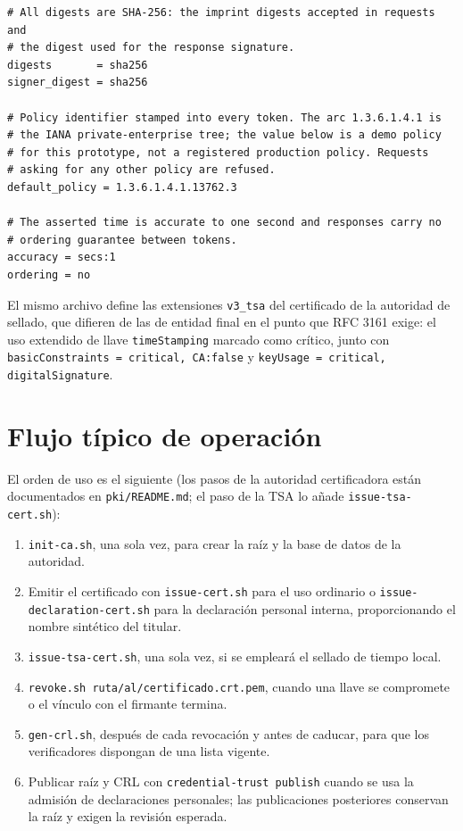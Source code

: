 \begin{lstlisting}[language={}, caption={Parámetros de emisión de tokens en \texttt{pki/tsa.cnf}.}, label={lst:pki-tsa-cnf}]
# All digests are SHA-256: the imprint digests accepted in requests and
# the digest used for the response signature.
digests       = sha256
signer_digest = sha256

# Policy identifier stamped into every token. The arc 1.3.6.1.4.1 is
# the IANA private-enterprise tree; the value below is a demo policy
# for this prototype, not a registered production policy. Requests
# asking for any other policy are refused.
default_policy = 1.3.6.1.4.1.13762.3

# The asserted time is accurate to one second and responses carry no
# ordering guarantee between tokens.
accuracy = secs:1
ordering = no
\end{lstlisting}

El mismo archivo define las extensiones \texttt{v3\_tsa} del certificado de la autoridad de sellado, que difieren de las de entidad final en el punto que RFC 3161 exige: el uso extendido de llave \texttt{timeStamping} marcado como crítico, junto con \texttt{basicConstraints = critical, CA:false} y \texttt{keyUsage = critical, digitalSignature}.



\section{Flujo típico de operación}\label{sec:pki-flujo}

El orden de uso es el siguiente (los pasos de la autoridad certificadora están documentados en \texttt{pki/README.md}; el paso de la TSA lo añade \texttt{issue-tsa-cert.sh}):

\begin{enumerate}
  \item \texttt{init-ca.sh}, una sola vez, para crear la raíz y la base de datos de la autoridad.
  \item Emitir el certificado con \texttt{issue-cert.sh} para el uso ordinario o \texttt{issue-declaration-cert.sh} para la declaración personal interna, proporcionando el nombre sintético del titular.
  \item \texttt{issue-tsa-cert.sh}, una sola vez, si se empleará el sellado de tiempo local.
  \item \texttt{revoke.sh ruta/al/certificado.crt.pem}, cuando una llave se compromete o el vínculo con el firmante termina.
  \item \texttt{gen-crl.sh}, después de cada revocación y antes de caducar, para que los verificadores dispongan de una lista vigente.
  \item Publicar raíz y CRL con \texttt{credential-trust publish} cuando se usa la admisión de declaraciones personales; las publicaciones posteriores conservan la raíz y exigen la revisión esperada.
\end{enumerate}

